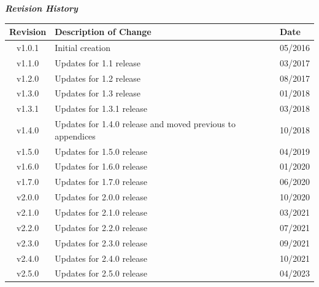 \maketitle
\thispagestyle{empty}
\newpage

\begin{center}
	\textit{\textbf{Revision History}}
	\begin{table}[H]
		\label{table:revisions} %
		\begin{tabularx}{\textwidth}{|c|X|l|}
			\hline
			\rowcolor{blue}
			\textbf{Revision} & \textbf{Description of Change} & \textbf{Date} \\
		    \hline
			v1.0.1 & Initial creation & 05/2016 \\
			\hline
			v1.1.0 & Updates for 1.1 release & 03/2017 \\
			\hline
			v1.2.0 & Updates for 1.2 release & 08/2017 \\
			\hline
			v1.3.0 & Updates for 1.3 release & 01/2018 \\
			\hline
			v1.3.1 & Updates for 1.3.1 release & 03/2018 \\
			\hline
			v1.4.0 & Updates for 1.4.0 release and moved previous to appendices & 10/2018 \\
			\hline
			v1.5.0 & Updates for 1.5.0 release & 04/2019 \\
			\hline
			v1.6.0 & Updates for 1.6.0 release & 01/2020 \\
			\hline
			v1.7.0 & Updates for 1.7.0 release & 06/2020 \\
			\hline
			v2.0.0 & Updates for 2.0.0 release & 10/2020 \\
			\hline
			v2.1.0 & Updates for 2.1.0 release & 03/2021 \\
			\hline
			v2.2.0 & Updates for 2.2.0 release & 07/2021 \\
			\hline
			v2.3.0 & Updates for 2.3.0 release & 09/2021 \\
			\hline
			v2.4.0 & Updates for 2.4.0 release & 10/2021 \\
			\hline
			v2.5.0 & Updates for 2.5.0 release & 04/2023 \\
			\hline
		\end{tabularx}
	\end{table}
\end{center}
\newpage

\tableofcontents
\renewcommand\thesection{\Roman{section}}
\renewcommand\thesubsection{\thesection-\arabic{subsection}}
\newpage
{}
